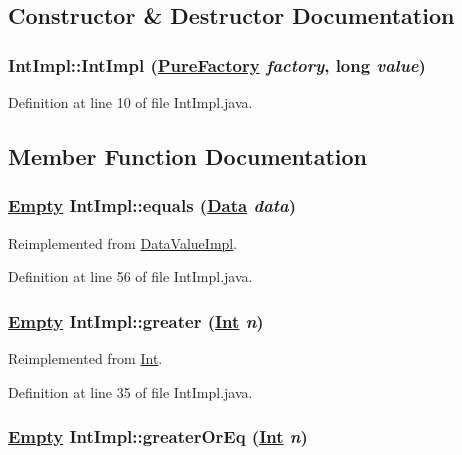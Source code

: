 \subsection{Constructor \& Destructor Documentation}
\hypertarget{classIntImpl_b0}{
\subsubsection[IntImpl]{\setlength{\rightskip}{0pt plus 5cm}Int\-Impl::Int\-Impl (\hyperlink{classPureFactory}{Pure\-Factory} {\em factory}, long {\em value})}}
\label{classIntImpl_b0}




Definition at line 10 of file Int\-Impl.java.

\subsection{Member Function Documentation}
\hypertarget{classIntImpl_a9}{
\subsubsection[equals]{\setlength{\rightskip}{0pt plus 5cm}\hyperlink{interfaceEmpty}{Empty} Int\-Impl::equals (\hyperlink{interfaceData}{Data} {\em data})}}
\label{classIntImpl_a9}




Reimplemented from \hyperlink{classDataValueImpl_a5}{Data\-Value\-Impl}.

Definition at line 56 of file Int\-Impl.java.\hypertarget{classIntImpl_a5}{
\subsubsection[greater]{\setlength{\rightskip}{0pt plus 5cm}\hyperlink{interfaceEmpty}{Empty} Int\-Impl::greater (\hyperlink{interfaceInt}{Int} {\em n})}}
\label{classIntImpl_a5}




Reimplemented from \hyperlink{interfaceInt_a5}{Int}.

Definition at line 35 of file Int\-Impl.java.\hypertarget{classIntImpl_a6}{
\subsubsection[greaterOrEq]{\setlength{\rightskip}{0pt plus 5cm}\hyperlink{interfaceEmpty}{Empty} Int\-Impl::greater\-Or\-Eq (\hyperlink{interfaceInt}{Int} {\em n})}}
\label{classIntImpl_a6}




